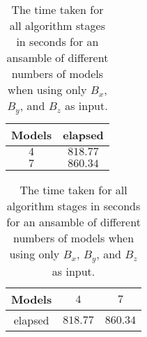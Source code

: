 \begin{table}[!ht]
	\centering
	\begin{tabular}{|c|c|}
		\hline
		Models & elapsed \\ \hline
		$4$ & $818.77$ \\ \hline
		$7$ & $860.34$ \\ \hline
	\end{tabular}
	\caption{The time taken for all algorithm stages in seconds for an ansamble of different numbers of models when using only $B_{x}$, $B_{y}$, and $B_{z}$ as input.}
	\label{tab:time:ansamble:coord}
\end{table}

\begin{table}[!ht]
	\centering
	\begin{tabular}{|c|c|c|}
		\hline
		Models & $4$ & $7$ \\ \hline
		elapsed & $818.77$ & $860.34$ \\ \hline
	\end{tabular}
	\caption{The time taken for all algorithm stages in seconds for an ansamble of different numbers of models when using only $B_{x}$, $B_{y}$, and $B_{z}$ as input.}
	\label{tab:time:ansamble:reverse:coord}
\end{table}
